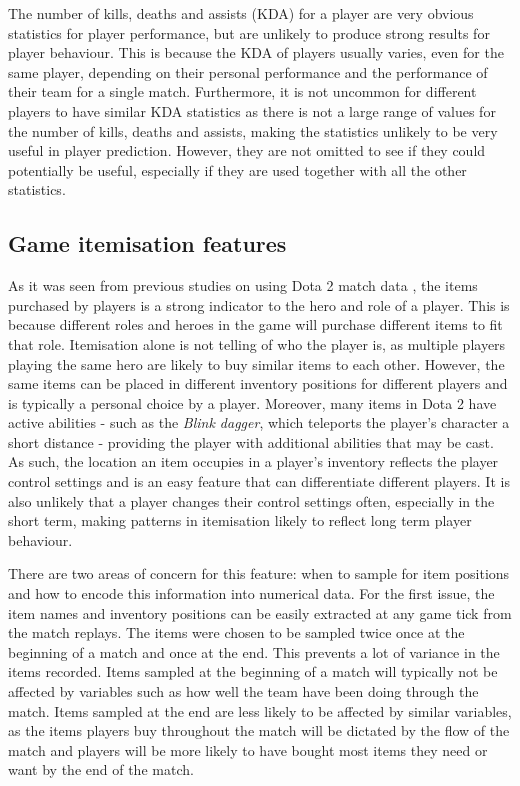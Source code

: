\documentclass[Report.tex]{subfiles}
\begin{document}
The number of kills, deaths and assists (KDA) for a player are very obvious statistics for player performance, but are unlikely to produce strong results for player behaviour. This is because the KDA of players usually varies, even for the same player, depending on their personal performance and the performance of their team for a single match. Furthermore, it is not uncommon for different players to have similar KDA statistics as there is not a large range of values for the number of kills, deaths and assists, making the statistics unlikely to be very useful in player prediction. However, they are not omitted to see if they could potentially be useful, especially if they are used together with all the other statistics.

\subsection{Game itemisation features}
As it was seen from previous studies on using Dota 2 match data \cite{dota-gao, dota-eggert}, the items purchased by players is a strong indicator to the hero and role of a player. This is because different roles and heroes in the game will purchase different items to fit that role. Itemisation alone is not telling of who the player is, as multiple players playing the same hero are likely to buy similar items to each other. However, the same items can be placed in different inventory positions for different players and is typically a personal choice by a player. Moreover, many items in Dota 2 have active abilities - such as the \textit{Blink dagger}, which teleports the player's character a short distance - providing the player with additional abilities that may be cast. As such, the location an item occupies in a player's inventory reflects the player control settings and is an easy feature that can differentiate different players. It is also unlikely that a player changes their control settings often, especially in the short term, making patterns in itemisation likely to reflect long term player behaviour.


There are two areas of concern for this feature: when to sample for item positions and how to encode this information into numerical data. For the first issue, the item names and inventory positions can be easily extracted at any game tick from the match replays. The items were chosen to be sampled twice  once at the beginning of a match and once at the end. This prevents a lot of variance in the items recorded. Items sampled at the beginning of a match will typically not be affected by variables such as how well the team have been doing through the match. Items sampled at the end are less likely to be affected by similar variables, as the items players buy throughout the match will be dictated by the flow of the match and players will be more likely to have bought most items they need or want by the end of the match. 
\end{document}
